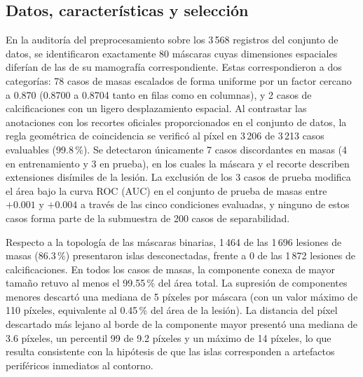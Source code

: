 
\subsection{Datos, características y selección}
\label{sec:datos_caracteristicas_seleccion}

En la auditoría del preprocesamiento sobre los 3\,568 registros del conjunto de datos,
se identificaron exactamente 80 máscaras cuyas dimensiones espaciales diferían de las de su
mamografía correspondiente. Estas correspondieron a dos categorías: 78 casos de masas
escalados de forma uniforme por un factor cercano a 0.870 (0.8700 a 0.8704 tanto en filas como en columnas),
y 2 casos de calcificaciones con un ligero desplazamiento espacial. Al contrastar las anotaciones
con los recortes oficiales proporcionados en el conjunto de datos, la regla geométrica de coincidencia
se verificó al píxel en 3\,206 de 3\,213 casos evaluables (99.8\,\%). Se detectaron únicamente 7 casos
discordantes en masas (4 en entrenamiento y 3 en prueba), en los cuales la máscara y el recorte describen
extensiones disímiles de la lesión. La exclusión de los 3 casos de prueba modifica el área bajo la curva
ROC (AUC) en el conjunto de prueba de masas entre $+0.001$ y $+0.004$ a través de las cinco condiciones
evaluadas, y ninguno de estos casos forma parte de la submuestra de 200 casos de separabilidad.

Respecto a la topología de las máscaras binarias, 1\,464 de las 1\,696 lesiones de masas
(86.3\,\%) presentaron islas desconectadas, frente a 0 de las 1\,872 lesiones de calcificaciones.
En todos los casos de masas, la componente conexa de mayor tamaño retuvo al menos el 99.55\,\% del área total.
La supresión de componentes menores descartó una mediana de 5 píxeles por máscara (con un valor máximo
de 110 píxeles, equivalente al 0.45\,\% del área de la lesión). La distancia del píxel descartado más lejano
al borde de la componente mayor presentó una mediana de 3.6 píxeles, un percentil 99 de 9.2 píxeles
y un máximo de 14 píxeles, lo que resulta consistente con la hipótesis de que las islas corresponden a artefactos periféricos inmediatos al contorno.


